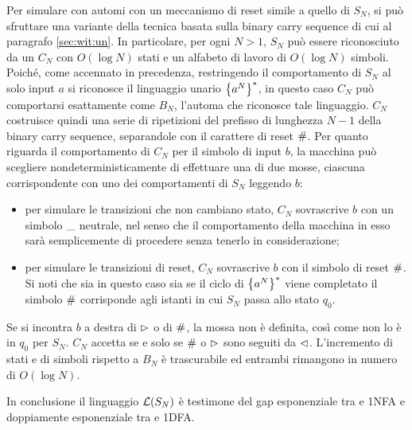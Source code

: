 Per simulare con  automi con un meccanismo di reset simile a quello di $S_N$, si può sfruttare una variante della tecnica basata sulla binary carry sequence di cui al paragrafo \ref{sec:wit:un}. In particolare, per ogni $N>1$, $S_N$ può essere riconosciuto da un  $C_N$ con $O(\log N)$ stati e un alfabeto di lavoro di $O(\log N)$ simboli.
Poiché, come accennato in precedenza, restringendo il comportamento di $S_N$ al solo input $a$ si riconosce il linguaggio unario $\left\{ a^N \right\}^*$, in questo caso $C_N$ può comportarsi esattamente come $B_N$, l'automa che riconosce tale linguaggio. $C_N$ costruisce quindi una serie di ripetizioni del prefisso di lunghezza $N-1$ della binary carry sequence, separandole con il carattere di reset $\#$. Per quanto riguarda il comportamento di $C_N$ per il simbolo di input $b$, la macchina può scegliere nondeterministicamente di effettuare una di due mosse, ciascuna corrispondente con uno dei comportamenti di $S_N$ leggendo $b$:
\begin{itemize}
	\item per simulare le transizioni che non cambiano stato, $C_N$ sovrascrive $b$ con un simbolo $\_$ neutrale, nel senso che il comportamento della macchina in esso sarà semplicemente di procedere senza tenerlo in considerazione;
	\item per simulare le transizioni di reset, $C_N$ sovrascrive $b$ con il simbolo di reset $\#$. Si noti che sia in questo caso sia se il ciclo di $\left\{ a^N \right\}^*$ viene completato il simbolo $\#$ corrisponde agli istanti in cui $S_N$ passa allo stato $q_0$.
\end{itemize}
Se si incontra $b$ a destra di $\rhd$ o di $\#$, la mossa non è definita, così come non lo è in $q_0$ per $S_N$. $C_N$ accetta se e solo se $\#$ o $\rhd$ sono seguiti da $\lhd$. L'incremento di stati e di simboli rispetto a $B_N$ è trascurabile ed entrambi rimangono in numero di $O(\log N)$.

In conclusione il linguaggio $\mathcal L(S_N)$ è testimone del gap esponenziale tra  e 1NFA e doppiamente esponenziale tra  e 1DFA.

